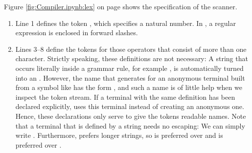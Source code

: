 \noindent
Figure \ref{fig:Compiler.ipynb:lex} on page \pageref{fig:Compiler.ipynb:lex} shows the specification of the
scanner.
\begin{enumerate}
\item Line 1 defines the token , which specifies a natural number.  In , a regular
      expression is enclosed in forward slashes.
\item Lines 3--8 define the tokens for those operators that consist of more than one character.  Strictly
      speaking, these definitions are not necessary: A string that occurs literally inside a grammar rule, for
      example \quoted{==}, is automatically turned into an .  However, the name that
       generates for an anonymous terminal built from a symbol like \quoted{==} has the form
      , and such a name is of little help when we inspect the token stream.  If a terminal with
      the same definition has been declared explicitly,  uses this terminal instead of creating
      an anonymous one.  Hence, these declarations only serve to give the tokens readable names.  Note that a
      terminal that is defined by a string needs no escaping: We can simply write \quoted{||}.  Furthermore,
       prefers longer strings, so \quoted{!=} is preferred over \quoted{!} and \quoted{<=} is
      preferred over \quoted{<}.


\end{enumerate}
